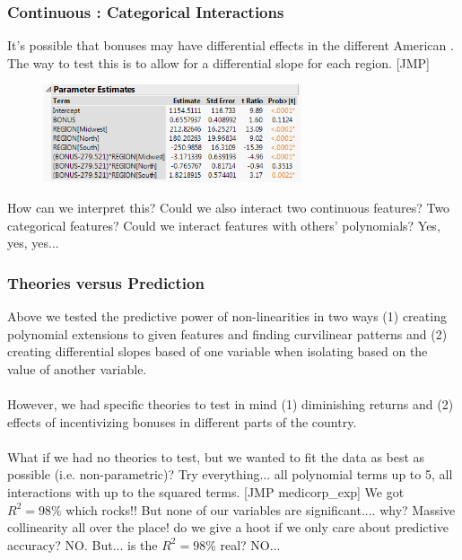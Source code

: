\documentclass[handout]{beamer}
\begin{document}
\begin{frame}\frametitle{Continuous : Categorical Interactions}

It's possible that bonuses may have differential effects in the different American . The way to test this is to allow for a differential slope for each region. [JMP] \pause


\begin{figure}
\centering\includegraphics[width=3in]{interactions.png}
\end{figure}

How can we interpret this? \pause Could we also interact two continuous features? Two categorical features? Could we interact features with others' polynomials? Yes, yes, yes...
	
\end{frame}

\begin{frame}\frametitle{Theories versus Prediction}

Above we tested the predictive power of non-linearities in two ways \pause (1) creating polynomial extensions to given features and finding curvilinear patterns and \pause (2) creating differential slopes based of one variable when isolating based on the value of another variable. \\~\\

However, we had specific theories to test in mind \pause (1) diminishing returns and (2) effects of incentivizing bonuses in different parts of the country. \\~\\

What if we had no theories to test, but we wanted to fit the data as best as possible (i.e. non-parametric)? \pause Try everything... all polynomial terms up to 5, all interactions with up to the squared terms. [JMP medicorp\_exp] \pause We got $R^2 = 98\%$ which rocks!! But none of our variables are significant.... why? \pause Massive collinearity all over the place! do we give a hoot if we only care about predictive accuracy? \pause NO. \pause But... is the $R^2 = 98\%$ real? \pause NO...
	
\end{frame}
\end{document}
